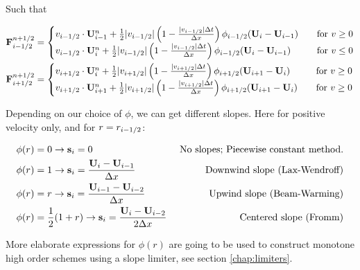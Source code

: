 Such that

\begin{align*}
	\mathbf{F}_{i-1/2}^{n+1/2} &= 
		\begin{cases}
			v_{i-1/2} \cdot \mathbf{U}_{i-1}^n + \frac{1}{2} |v_{i-1/2}|  \left(1 -  \frac{|v_{i-1/2}| \Delta t}{\Delta x} \right) \phi_{i-1/2} ( \mathbf{U}_i - \mathbf{U}_{i-1} )
			 	& \quad \text{for } v \geq 0 \\
			v_{i-1/2} \cdot \mathbf{U}_{i}^n + \frac{1}{2} |v_{i-1/2}|  \left(1 -  \frac{|v_{i-1/2}| \Delta t}{\Delta x} \right) \phi_{i-1/2} ( \mathbf{U}_i - \mathbf{U}_{i-1} )
				& \quad \text{for } v \leq 0 \\
		\end{cases} \\		
	\mathbf{F}_{i+1/2}^{n+1/2} &= 
		\begin{cases}
			v_{i+1/2} \cdot \mathbf{U}_{i}^n + \frac{1}{2} |v_{i+1/2}|  \left(1 -  \frac{|v_{i+1/2}| \Delta t}{\Delta x} \right) \phi_{i+1/2} ( \mathbf{U}_{i+1} - \mathbf{U}_{i} )
			 	& \quad \text{for } v \geq 0 \\
			v_{i+1/2} \cdot \mathbf{U}_{i+1}^n + \frac{1}{2} |v_{i+1/2}|  \left(1 -  \frac{|v_{i+1/2}| \Delta t}{\Delta x} \right) \phi_{i+1/2} ( \mathbf{U}_{i+1} - \mathbf{U}_{i} )
			 	& \quad \text{for } v \geq 0 \\
		\end{cases} \\		
\end{align*}






Depending on our choice of $\phi$, we can get different slopes. 
Here for positive velocity only, and for $r = r_{i-1/2}$:

\begin{align*}
	\phi(r) & = 0 \rightarrow \mathbf{s}_i = 0 
		&\text{ No slopes; Piecewise constant method.}\\
	\phi(r) & = 1 \rightarrow \mathbf{s}_i = \frac{\mathbf{U}_{i} - \mathbf{U}_{i-1}}{\Delta x} 
		&\text{ Downwind slope (Lax-Wendroff)} \\
	\phi(r) & = r \rightarrow \mathbf{s}_i = \frac{\mathbf{U}_{i-1} - \mathbf{U}_{i-2}}{\Delta x} 
		&\text{Upwind slope (Beam-Warming)} \\
	\phi(r) & = \frac{1}{2} (1 + r) \rightarrow \mathbf{s}_i = \frac{\mathbf{U}_{i} - \mathbf{U}_{i-2}}{2 \Delta x} 
		&\text{ Centered slope (Fromm)} \\
\end{align*}


More elaborate expressions for $\phi(r)$ are going to be used to construct monotone high order schemes using a slope limiter, see section \ref{chap:limiters}.

















